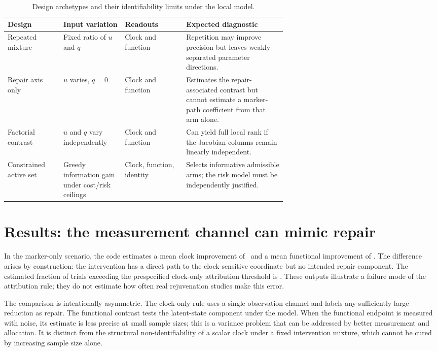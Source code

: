\documentclass[10pt,a4paper]{article}
\begin{document}
\begin{table}[!htbp]
\centering
\caption{Design archetypes and their identifiability limits under the local model.}
\label{tab:design-archetypes}
\small
\begin{tabularx}{\linewidth}{p{0.20\linewidth} p{0.22\linewidth} p{0.22\linewidth} X}
\toprule
\textbf{Design} & \textbf{Input variation} & \textbf{Readouts} & \textbf{Expected diagnostic} \\
\midrule
Repeated mixture & Fixed ratio of \(u\) and \(q\) & Clock and function & Repetition may improve precision but leaves weakly separated parameter directions. \\
Repair axis only & \(u\) varies, \(q=0\) & Clock and function & Estimates the repair-associated contrast but cannot estimate a marker-path coefficient from that arm alone. \\
Factorial contrast & \(u\) and \(q\) vary independently & Clock and function & Can yield full local rank if the Jacobian columns remain linearly independent. \\
Constrained active set & Greedy information gain under cost/risk ceilings & Clock, function, identity & Selects informative admissible arms; the risk model must be independently justified. \\
\bottomrule
\end{tabularx}
\end{table}

\section{Results: the measurement channel can mimic repair}
In the marker-only scenario, the code estimates a mean clock improvement of \ClockOnlyMean\ and a mean functional improvement of \FunctionalOnlyMean. The difference arises by construction: the intervention has a direct path to the clock-sensitive coordinate but no intended repair component. The estimated fraction of trials exceeding the prespecified clock-only attribution threshold is \FalsePositiveRate. These outputs illustrate a failure mode of the attribution rule; they do not estimate how often real rejuvenation studies make this error.

The comparison is intentionally asymmetric. The clock-only rule uses a single observation channel and labels any sufficiently large reduction as repair. The functional contrast tests the latent-state component under the model. When the functional endpoint is measured with noise, its estimate is less precise at small sample sizes; this is a variance problem that can be addressed by better measurement and allocation. It is distinct from the structural non-identifiability of a scalar clock under a fixed intervention mixture, which cannot be cured by increasing sample size alone.
\end{document}
